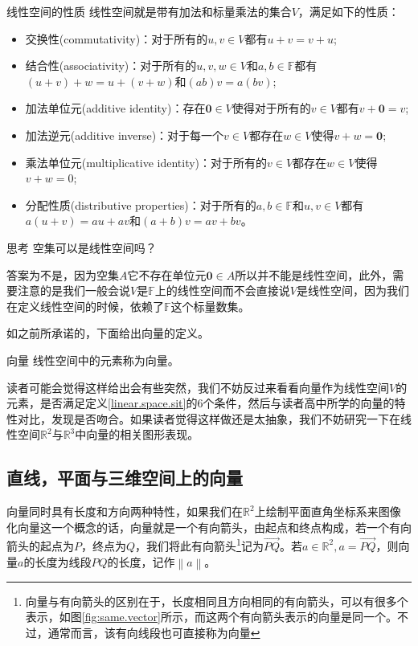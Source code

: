 \begin{corollary}{线性空间的性质}
	\label{linear.space.sit}
	线性空间就是带有加法和标量乘法的集合$V$，满足如下的性质：
	\begin{itemize}
		\item 交换性(commutativity)：对于所有的$u,v\in V$都有$u+v=v+u$;
		\item 结合性(associativity)：对于所有的$u,v,w \in V$和$a,b\in \mathbb{F}$都有$(u+v)+w=u+(v+w)$和$(ab)v=a(bv)$;
		\item 加法单位元(additive identity)：存在$\boldsymbol{0}\in V$使得对于所有的$v\in V$都有$v+\boldsymbol{0}=v$;
		\item 加法逆元(additive inverse)：对于每一个$v\in V$都存在$w\in V$使得$v+w=\boldsymbol{0}$;
		\item 乘法单位元(multiplicative identity)：对于所有的$v\in V$都存在$w\in V$使得$v+w=0$;
		\item 分配性质(distributive properties)：对于所有的$a,b \in \mathbb{F}$和$u,v \in V$都有$a(u+v)=au+av$和$(a+b)v=av+bv$。
	\end{itemize}
\end{corollary}

\begin{ascolorbox1}{思考}
	空集可以是线性空间吗？
\end{ascolorbox1}

答案为不是，因为空集$A$它不存在单位元$\boldsymbol{0}\in A$所以并不能是线性空间，此外，需要注意的是我们一般会说$V$是$\mathbb{F}$上的线性空间而不会直接说$V$是线性空间，因为我们在定义线性空间的时候，依赖了$\mathbb{F}$这个标量数集。

如之前所承诺的，下面给出向量的定义。

\begin{definition}{向量}
	线性空间中的元素称为向量。
\end{definition}

读者可能会觉得这样给出会有些突然，我们不妨反过来看看向量作为线性空间$V$的元素，是否满足定义\ref{linear.space.sit}的6个条件，然后与读者高中所学的向量的特性对比，发现是否吻合。如果读者觉得这样做还是太抽象，我们不妨研究一下在线性空间$\mathbb{R}^2$与$\mathbb{R}^3$中向量的相关图形表现。

\subsection{直线，平面与三维空间上的向量}

向量同时具有长度和方向两种特性，如果我们在$\mathbb{R}^2$上绘制平面直角坐标系来图像化向量这一个概念的话，向量就是一个有向箭头，由起点和终点构成，若一个有向箭头的起点为$P$，终点为$Q$，我们将此有向箭头\footnote{向量与有向箭头的区别在于，长度相同且方向相同的有向箭头，可以有很多个表示，如图\ref{fig:same.vector}所示，而这两个有向箭头表示的向量是同一个。不过，通常而言，该有向线段也可直接称为向量}记为$\overrightarrow{PQ}$。若$a\in \mathbb{R}^2,a=\overrightarrow{PQ}$，则向量$a$的长度为线段$PQ$的长度，记作$\left \| a \right \| $。


